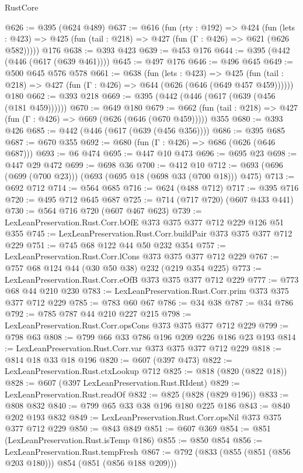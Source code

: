 \begin{lexlean}{RustCore}
\begin{coremodule}
@626 := @395 (@624 @489)
@637 := @616
    (fun (rty : @192) =>
    @424
      (fun (lets : @423) => @425 (fun (tail : @218) => @427 (fun (Γ : @426) => @621 (@626 @582)))))
    @176
@638 := @393 @423
@639 := @453 @176
@644 := @395 (@442 (@446 (@617 (@639 @461))))
@645 := @497 @176
@646 := @496 @645
@649 := @500 @645 @576 @578
@661 := @638
    (fun (lets : @423) =>
    @425 (fun (tail : @218) => @427 (fun (Γ : @426) => @644 (@626 (@646 (@649 @457 @459))))))
    @180
@662 := @393 @218
@669 := @395 (@442 (@446 (@617 (@639 (@456 (@181 @459))))))
@670 := @649 @180
@679 := @662 (fun (tail : @218) => @427 (fun (Γ : @426) => @669 (@626 (@646 (@670 @459))))) @355
@680 := @393 @426
@685 := @442 (@446 (@617 (@639 (@456 @356))))
@686 := @395 @685
@687 := @670 @355
@692 := @680 (fun (Γ : @426) => @686 (@626 (@646 @687)))
@693 := @6 @474
@695 := @447 @10 @473
@696 := @695 @23
@698 := @447 @29 @472
@699 := @698 @36
@700 := @412 @10
@712 := @693 (@696 (@699 (@700 @23))) (@693 (@695 @18 (@698 @33 (@700 @18))) @475)
@713 := @692 @712
@714 := @564 @685
@716 := @624 (@488 @712)
@717 := @395 @716
@720 := @495 @712 @645 @687
@725 := @714 (@717 @720) (@607 @433 @441)
@730 := @564 @716 @720 (@607 @467 @623)
@739 := LexLeanPreservation.Rust.Corr.bOfE @373 @375 @377 @712 @229 @126 @51 @355
@745 := LexLeanPreservation.Rust.Corr.buildPair @373 @375 @377 @712 @229
@751 := @745 @68 @122 @44 @50 @232 @354
@757 := LexLeanPreservation.Rust.Corr.lCons @373 @375 @377 @712 @229
@767 := @757 @68 @124 @44 (@30 @50 @38) @232 (@219 @354 @225)
@773 := LexLeanPreservation.Rust.Corr.eOfB @373 @375 @377 @712 @229
@777 := @773 @68 @44 @210 @230
@783 := LexLeanPreservation.Rust.Corr.prim @373 @375 @377 @712 @229
@785 := @783 @60 @67
@786 := @34 @38
@787 := @34 @786
@792 := @785 @787 @44 @210 @227 @215
@798 := LexLeanPreservation.Rust.Corr.opsCons @373 @375 @377 @712 @229
@799 := @798 @63
@808 := @799 @66 @33 @786 @196 @209 @226 @186 @23 @193
@814 := LexLeanPreservation.Rust.Corr.var @373 @375 @377 @712 @229
@818 := @814 @18 @33 @18 @196
@820 := @607 (@397 @473)
@822 := LexLeanPreservation.Rust.ctxLookup @712
@825 := @818 (@820 (@822 @18))
@828 := @607 (@397 LexLeanPreservation.Rust.RIdent)
@829 := LexLeanPreservation.Rust.readOf
@832 := @825 (@828 (@829 @196))
@833 := @808 @832
@840 := @799 @65 @33 @38 @196 @180 @225 @186
@843 := @840 @202 @193 @832
@849 := LexLeanPreservation.Rust.Corr.opsNil @373 @375 @377 @712 @229
@850 := @843 @849
@851 := @607 @369
@854 := @851 (LexLeanPreservation.Rust.isTemp @186)
@855 := @850 @854
@856 := LexLeanPreservation.Rust.tempFresh
@867 := @792 (@833 (@855 (@851 (@856 @203 @180))) @854 (@851 (@856 @188 @209)))

\end{coremodule}
\end{lexlean}
